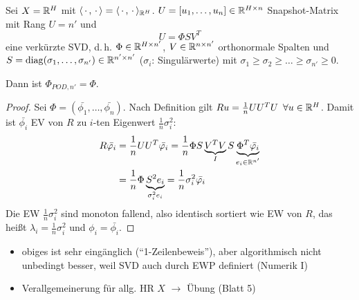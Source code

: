 \begin{satz}[Berechnung für $X=\R^H$ via SVD]
	Sei $X=\R^H$ mit $\langle \,\cdot\,, \,\cdot\, \rangle = \langle \,\cdot\,, \,\cdot\, \rangle_{\mathbb{R}^H}$. $U = [u_1,\dots,u_n] \in \mathbb{R}^{H \times n}$ Snapshot-Matrix mit Rang $U = n'$ und
	\[
		U = \Phi S V^T
	\]
	eine verkürzte SVD, d.\,h. $\Phi \in \mathbb{R}^{H \times n'}$, $V \in \mathbb{R}^{n \times n'}$ orthonormale Spalten und $S= \operatorname{diag}(\sigma_1,\dots, \sigma_{n'}) \in \mathbb{R}^{n' \times n'}$ ($\sigma_i$: Singulärwerte) mit $\sigma_1 \geq \sigma_2 \geq \dots \geq \sigma_{n'} \geq 0$.
	
	Dann ist $\Phi_{POD,n'} = \Phi$.
	\begin{proof}
	Sei $\Phi = (\bar{\phi_1},\dots,\bar{\phi_n})$. Nach Definition gilt $Ru = \frac{1}{n} U U^T U \,\,\, \forall u \in \mathbb{R}^H$. Damit ist $\bar{\phi_i}$ EV von $R$ zu $i$-ten Eigenwert $\frac{1}{n} \sigma_i^2$:
	\begin{align*}
		R \bar{\varphi_i} &= \frac{1}{n} U U^T \bar{\varphi_i} = \frac{1}{n} \Phi S \underbrace{V^T V}_{I} S \underbrace{\Phi^T \bar{\varphi_i}}_{e_i \in \mathbb{R}^{n'}} \\
		&= \frac{1}{n} \Phi \underbrace{S^2 e_i}_{\sigma_i^2 e_i} = \frac{1}{n} \sigma_i^2 \bar{\varphi_i}
	\end{align*}
	Die EW $\frac{1}{n} \sigma_i^2$ sind monoton fallend, also identisch sortiert wie EW von $R$, das heißt $\lambda_i = \frac{1}{n} \sigma_i^2$ und $\phi_i = \bar{\phi_i}$.
	\end{proof}
\end{satz}

\begin{bem} \beginwithlistbem
	\begin{itemize}
		\item obiges ist sehr eingänglich (``1-Zeilenbeweis''), aber algorithmisch nicht unbedingt besser, weil SVD auch durch EWP definiert (Numerik I)
		\item Verallgemeinerung für allg. HR $X$ $\rightarrow$ Übung (Blatt 5)
	\end{itemize}
\end{bem}

